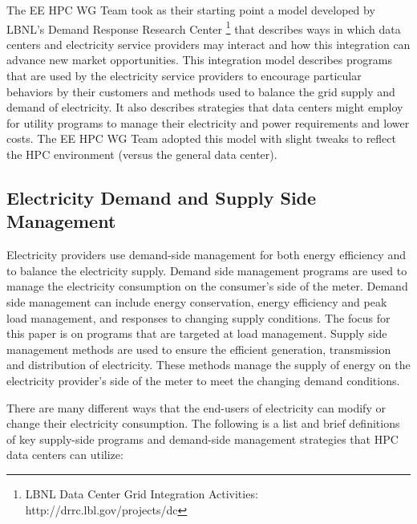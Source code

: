 The EE HPC WG Team took as their starting point a model developed by LBNL's 
Demand Response Research Center \footnote{LBNL
Data Center Grid Integration Activities: http://drrc.lbl.gov/projects/dc} that
describes ways in which data centers and electricity service providers may
interact and how this integration can advance new market opportunities. This
integration model describes programs that are used by the electricity service
providers to encourage particular behaviors by their customers and methods used
to balance the grid supply and demand of electricity. It also describes
strategies that data centers might employ for utility programs to manage their
electricity and power requirements and lower costs. The EE HPC WG Team adopted
this model with slight tweaks to reflect the HPC environment (versus the
general data center).


\subsection{Electricity Demand and Supply Side Management}

Electricity providers use demand-side management for both energy efficiency and to balance the electricity supply. 
Demand side management programs are used to manage the electricity consumption on the consumer’s side of the meter.  
Demand side management can include energy conservation, energy efficiency and peak load management, and responses to 
changing supply conditions.  The focus for this paper is on programs that are targeted at load management. 
Supply side management methods are used to ensure the efficient generation, transmission and distribution of 
electricity.  These methods 
manage the supply of energy on the electricity provider’s side of the meter to meet the changing demand conditions. 

There are many different ways that the end-users of electricity can modify or change their electricity consumption. 
The following is a list and 
brief definitions of key supply-side programs and demand-side management strategies that HPC data centers can utilize:



